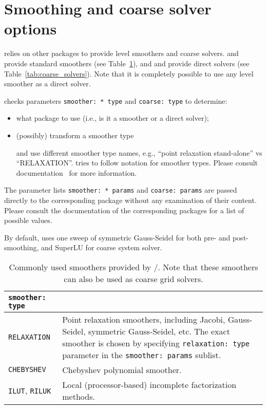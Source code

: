 

\section{Smoothing and coarse solver options}
\label{sec:options_smoothing}

\muelu{} relies on other \trilinos{} packages to provide level smoothers and
coarse solvers. \ifpack{} and \ifpacktwo{} provide standard smoothers (see
Table~\ref{tab:smoothers}), and \amesos{} and \amesostwo{} provide direct
solvers (see Table~\ref{tab:coarse_solvers}). Note that it is completely possible to use
any level smoother as a direct solver.

\muelu{} checks parameters \verb|smoother: * type| and \verb|coarse: type| to
determine:
\begin{itemize}
  \item what package to use (i.e., is it a smoother or a direct solver);
  \item (possibly) transform a smoother type

     \ifpack{} and \ifpacktwo{} use different smoother type names,
    e.g., ``point relaxation stand-alone'' vs ``RELAXATION''.  \muelu{} tries to follow
    \ifpacktwo{} notation for smoother types. Please consult \ifpacktwo{}
    documentation~\cite{Ifpack2} for more information.
\end{itemize}
The parameter lists \verb|smoother: * params| and \verb|coarse: params| are
passed directly to the corresponding package without any examination of their
content. Please consult the documentation of the corresponding packages for a list of
possible values.

By default, \muelu{} uses one sweep of symmetric Gauss-Seidel for both pre- and
post-smoothing, and SuperLU for coarse system solver.

\begin{table}[tbh]
  \begin{center}
    \begin{tabular}{p{4.0cm} p{10cm}}
      \toprule
      \texttt{smoother: type}           & \\
      \midrule
      \verb|RELAXATION|                 & Point relaxation smoothers, including
                                          Jacobi, Gauss-Seidel, symmetric Gauss-Seidel, etc. The exact
                                          smoother is chosen by specifying \texttt{relaxation: type} parameter in
                                          the \texttt{smoother: params} sublist. \\
      \verb|CHEBYSHEV|                  & Chebyshev polynomial smoother. \\
      \verb|ILUT|, \verb|RILUK|         & Local (processor-based) incomplete factorization methods. \\
      \bottomrule
    \end{tabular}
    \caption{Commonly used smoothers provided by \ifpack{}/\ifpacktwo{}. Note
    that these smoothers can also be used as coarse grid solvers.}
\label{tab:smoothers}
  \end{center}
\end{table}

